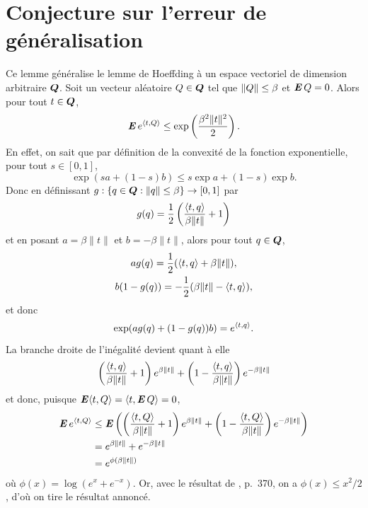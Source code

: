 \section{Conjecture sur l'erreur de généralisation}
\label{sec:appexp}

\begin{lemme}
  \label{b:lem:hoeffding}
  Ce lemme généralise le lemme de Hoeffding à un espace vectoriel de dimension arbitraire
  $\bm Q$. Soit un vecteur aléatoire $Q\in\bm Q$ tel que $\|Q\|\leq\beta$ et $\operatorname{\mbox{\textbf{\textit{E}}}} Q = 0$. Alors pour tout
  $t\in\bm Q$, 
  \begin{equation}
    \operatorname{\mbox{\textbf{\textit{E}}}} e^{\langle t,Q\rangle} \leq \exp\left(\frac{\beta^2\|t\|^2}{2}\right).
  \end{equation}
  En effet, on sait que par définition de la convexité de la fonction exponentielle, pour
  tout $s\in[0,1]$,
  \begin{equation}
    \exp(sa + (1-s)b) \leq s\exp a + (1-s)\exp b.
  \end{equation}
  Donc en définissant $g:\{q \in \bm Q:\|q\|\leq\beta\}\to[0,1]$ par
  \begin{equation}
    g(q) = \frac{1}{2}\left(\frac{\langle t,q\rangle}{\beta\|t\|} + 1\right)
  \end{equation}
  et en posant $a = \beta\|t\|$ et $b = -\beta\|t\|$, alors pour tout $q \in \bm Q$,
  \begin{gather}
    a g(q) = \frac{1}{2}(\langle t,q\rangle + \beta\|t\|),\\
    b (1-g(q)) = - \frac{1}{2}(\beta\|t\| - \langle t,q\rangle),
  \end{gather}
  et donc
  \begin{equation}
    \exp(ag(q) + (1-g(q))b) = e^{\langle t,q\rangle}.
  \end{equation}
  La branche droite de l'inégalité devient quant à elle
  \begin{equation}
    \left(\frac{\langle t,q\rangle}{\beta\|t\|} + 1\right)e^{\beta\|t\|} + \left(1-\frac{\langle t,q\rangle}{\beta\|t\|}\right)e^{-\beta\|t\|}
  \end{equation}
  et donc, puisque $\operatorname{\mbox{\textbf{\textit{E}}}}\langle t,Q\rangle = \langle t,\operatorname{\mbox{\textbf{\textit{E}}}} Q\rangle = 0$, 
  \begin{align}
    \operatorname{\mbox{\textbf{\textit{E}}}} e^{\langle t,Q\rangle} &\leq \operatorname{\mbox{\textbf{\textit{E}}}}\left(\left(\frac{\langle t,Q\rangle}{\beta\|t\|} + 1\right)e^{\beta\|t\|} +
                       \left(1-\frac{\langle t,Q\rangle}{\beta\|t\|}\right)e^{-\beta\|t\|}\right)\\
                     &= e^{\beta\|t\|} + e^{-\beta\|t\|}\\
                     &= e^{\phi(\beta\|t\|)}
  \end{align}
  où $\phi(x) = \log(e^{x} + e^{-x})$. Or, avec le résultat de \cite{mohri2012foundations},
  p.~370, on a $\phi(x) \leq x^2/2$, d'où on tire le résultat annoncé.
\end{lemme}

